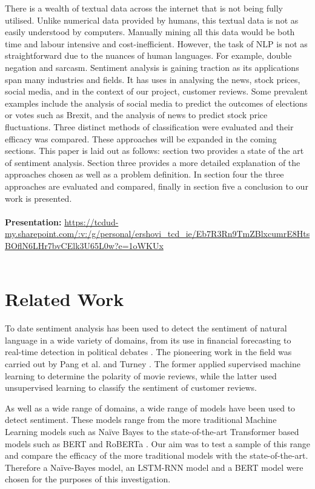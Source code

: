 \documentclass{svproc}
\begin{document}
There is a wealth of textual data across the internet that is not being fully utilised. Unlike numerical data provided by humans, this textual data is not as easily understood by computers. Manually mining all this data would be both time and labour intensive and cost-inefficient. However, the task of NLP is not as straightforward due to the nuances of human languages. For example, double negation and sarcasm. Sentiment analysis is gaining traction as its applications span many industries and fields. It has uses in analysing the news, stock prices, social media, and in the context of our project, customer reviews. Some prevalent examples include the analysis of social media to predict the outcomes of elections or votes such as Brexit, and the analysis of news to predict stock price fluctuations. 
Three distinct methods of classification were evaluated and their efficacy was compared. These approaches will be expanded in the coming sections. This paper is laid out as follows: section two provides a state of the art of sentiment analysis. Section three provides a more detailed explanation of the approaches chosen as well as a problem definition. In section four the three approaches are evaluated and compared, finally in section five a conclusion to our work is presented.
\\
\\
\textbf{Presentation:}
\url{https://tcdud-my.sharepoint.com/:v:/g/personal/ershovi_tcd_ie/Eb7R3Rn9TmZBlxcumrE8HtsBOflN6LHr7bvCElk3U65L0w?e=1oWKUx}
\\

\\

\section{Related Work}
To date sentiment analysis has been used to detect the sentiment of natural language in a wide variety of domains, from its use in financial forecasting \citep{li2020incorporating} to real-time detection in political debates \citep{tumasjan2010predicting}. The pioneering work in the field was carried out by Pang et al. \citep{pang2002thumbs} and Turney \citep{turney2002thumbs}. The former applied supervised machine learning to determine the polarity of movie reviews, while the latter used unsupervised learning to classify the sentiment of customer reviews.

As well as a wide range of domains, a wide range of models have been used to detect sentiment. These models range from the more traditional Machine Learning models such as Naïve Bayes to the state-of-the-art Transformer based models such as BERT and RoBERTa \citep{carvalho2020evaluation}. Our aim was to test a sample of this range and compare the efficacy of the more traditional models with the state-of-the-art. Therefore a Naïve-Bayes model, an LSTM-RNN model and a BERT model were chosen for the purposes of this investigation.
\end{document}
